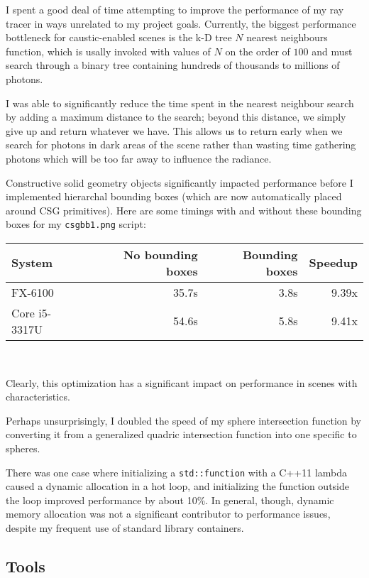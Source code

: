 \documentclass{article}
\begin{document}
I spent a good deal of time attempting to improve the performance of my ray
tracer in ways unrelated to my project goals. Currently, the biggest performance
bottleneck for caustic-enabled scenes is the k-D tree $N$ nearest neighbours
function, which is usally invoked with values of $N$ on the order of $100$ and
must search through a binary tree containing hundreds of thousands to millions
of photons.

I was able to significantly reduce the time spent in the nearest neighbour
search by adding a maximum distance to the search; beyond this distance, we simply give up
and return whatever we have. This allows us to return early when we search for
photons in dark areas of the scene rather than wasting time gathering photons
which will be too far away to influence the radiance.

Constructive solid geometry objects significantly impacted performance before I
implemented hierarchal bounding boxes (which are now automatically placed around
CSG primitives). Here are some timings with and without these bounding boxes for
my {\tt csgbb1.png} script: \\

\begin{center}
\begin{tabular}{|l|r|r|r|} \hline
 System & No bounding boxes & Bounding boxes & Speedup \\\hline
 FX-6100 & 35.7s & 3.8s & 9.39x \\\hline
 Core i5-3317U & 54.6s & 5.8s & 9.41x \\\hline
\end{tabular} \\
\end{center}

Clearly, this optimization has a significant impact on performance in scenes
with characteristics.

Perhaps unsurprisingly, I doubled the speed of my sphere intersection function
by converting it from a generalized quadric intersection function into one
specific to spheres.

There was one case where initializing a {\tt std::function} with a C++11
lambda caused a dynamic allocation in a hot loop, and initializing
the function outside the loop improved performance by about 10\%. In general,
though, dynamic memory allocation was not a significant contributor to
performance issues, despite my frequent use of standard library containers.

\subsection{Tools}
\end{document}
